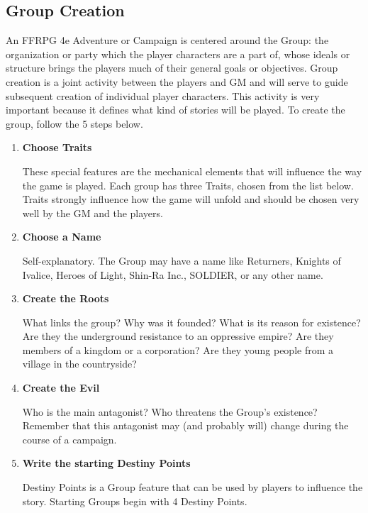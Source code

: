\begin{multicols}{2}

\section{Group Creation}
An FFRPG 4e Adventure or Campaign is
centered around the Group: the organization or
party which the player characters are a part of,
whose ideals or structure brings the players much
of their general goals or objectives. Group creation
is a joint activity between the players and GM and
will serve to guide subsequent creation of
individual player characters. This activity is very
important because it defines what kind of stories
will be played. To create the group, follow the 5
steps below.
\begin{enumerate}

\item \textbf{Choose Traits}

These special features are the mechanical
elements that will influence the way the game is
played. Each group has three Traits, chosen from
the list below. Traits strongly influence how the
game will unfold and should be chosen very well
by the GM and the players.

\item \textbf{Choose a Name}

Self-explanatory. The Group may have a name like
Returners, Knights of Ivalice, Heroes of Light, Shin-Ra
Inc., SOLDIER, or any other name.

\item \textbf{Create the Roots}

What links the group? Why was it founded? What
is its reason for existence? Are they the
underground resistance to an oppressive empire?
Are they members of a kingdom or a corporation?
Are they young people from a village in the
countryside?

\item \textbf{Create the Evil}

Who is the main antagonist? Who threatens the
Group’s existence? Remember that this antagonist
may (and probably will) change during the course
of a campaign.

\item \textbf{Write the starting Destiny Points}

Destiny Points is a Group feature that can be used
by players to influence the story. Starting Groups
begin with 4 Destiny Points.
\end{enumerate}

\end{multicols}

